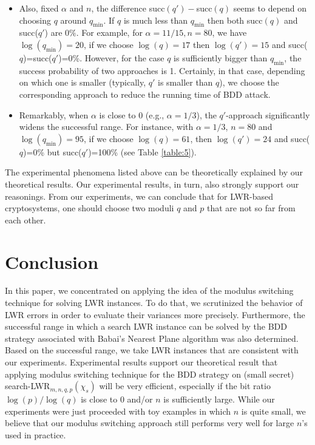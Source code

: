 \documentclass[runningheads]{llncs}
\begin{document}
\begin{itemize}
\item Also, fixed $\alpha$ and $n$, the difference succ$(q')-$succ$(q)$ seems to depend on choosing $q$ around $q_{\text{min}}$. If $q$ is much less than $q_{\text{min}}$ then both succ$(q)$ and succ($q'$) are $0\%$. For example, for $\alpha=11/15, n=80$, we have $\log({q_{\text{min}}})=20$, if we choose $\log (q)=17$ then $\log (q')=15$ and succ($q$)=succ($q'$)=0\%. However, for the case  $q$ is sufficiently bigger than $q_{\text{min}}$, the success probability of two approaches is 1. Certainly, in that case, depending on which one is smaller (typically, $q'$ is smaller than $q$), we choose the corresponding approach to reduce the running time of BDD attack. 
\item Remarkably, when $\alpha$ is close to $0$ (e.g., $\alpha=1/3$), the $q'$-approach significantly widens the successful range. For instance, with $\alpha=1/3$, $n=80$ and $\log({q_{\text{min}}})=95$, if we choose $\log(q)=61$, then $\log(q')=24$ and succ($q$)=0\% but succ($q'$)=100\% (see Table \ref{table:5}).
\end{itemize}
The experimental phenomena listed above can be theoretically explained by our theoretical results. Our experimental results, in turn, also strongly support our reasonings. From our experiments, we can conclude that for LWR-based cryptosystems, one should choose two moduli $q$ and $p$ that are not so far from each other. 

\section{Conclusion}

In this paper, we concentrated on applying the idea of the modulus switching technique for solving LWR instances. To do that, we scrutinized the behavior of LWR errors in order to evaluate their variances more precisely. Furthermore, the successful range in which a search LWR instance can be solved by the BDD strategy associated with Babai's Nearest Plane algorithm was also determined. Based on the successful range, we take LWR instances that are consistent with our experiments. Experimental results support our theoretical result that applying modulus switching technique for the BDD strategy on (small secret) search-LWR$_{m,n,q,p}(\chi_s)$ will be very efficient, especially if the bit ratio $\log(p)/\log(q)$ is close to 0 and/or $n$ is sufficiently large. While our experiments were just proceeded with toy examples in which $n$ is quite small, we believe that our modulus switching approach still performs very well for large $n$'s used in practice. 
\end{document}
